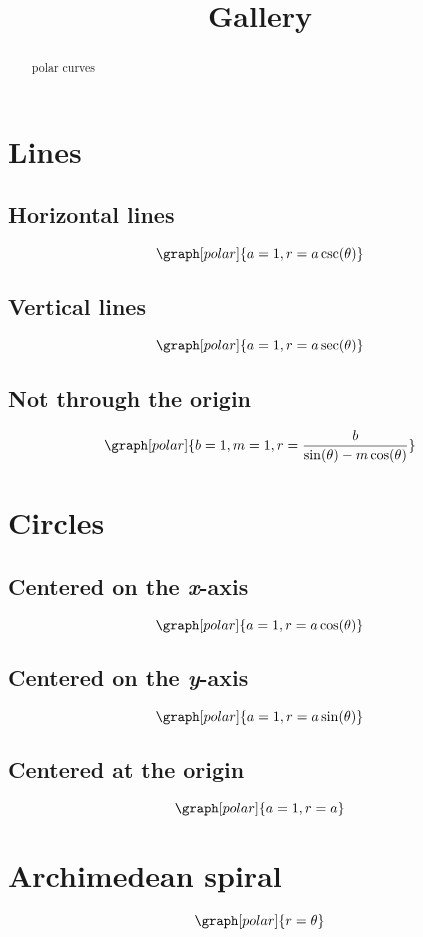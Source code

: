 \documentclass{ximera}
\title{Gallery}
\begin{document}
\begin{abstract}
polar curves
\end{abstract}
\maketitle

\section{Lines}

\subsection{Horizontal lines}
\[
\graph[polar]{a=1,r=a \csc(\theta)}
\]
\subsection{Vertical lines}
\[
\graph[polar]{a=1,r=a \sec(\theta)}
\]
\subsection{Not through the origin}
\[
\graph[polar]{b=1,m=1,r=\frac{b}{\sin(\theta)-m \cos(\theta)}}
\]

\section{Circles}

\subsection{Centered on the \textit{x}-axis}
\[
\graph[polar]{a=1, r=a \cos(\theta)}
\]

\subsection{Centered on the \textit{y}-axis}
\[
\graph[polar]{a=1,r=a \sin(\theta)}
\]

\subsection{Centered at the origin}
\[
\graph[polar]{a=1,r=a}
\]

\section{Archimedean spiral}
\[
\graph[polar]{r=\theta}
\]
\end{document}
